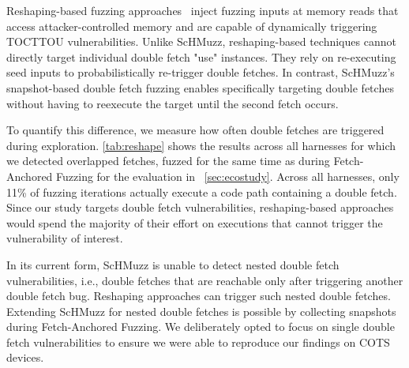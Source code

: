 \documentclass[conference]{IEEEtran}
\newcommand{\sysname}{ScHMuzz\xspace}
\newcommand{\stagetwo}{Fetch-Anchored Fuzzing\xspace}
\newcommand{\numexecsdfperc}{11\%\xspace}
\begin{document}
Reshaping-based fuzzing approaches~\cite{morphuzz, chen2024enclavefuzz} 
inject fuzzing inputs at memory reads that access 
attacker-controlled memory and are capable of dynamically triggering TOCTTOU vulnerabilities. 
Unlike \sysname, reshaping-based techniques cannot directly target individual double fetch "use" 
instances. They rely on re-executing seed inputs to probabilistically 
re-trigger double fetches. In contrast, \sysname's snapshot-based double fetch fuzzing 
enables specifically targeting double fetches without having to reexecute the target until 
the second fetch occurs. 

To quantify this difference, we measure 
how often double fetches are triggered during exploration. \autoref{tab:reshape} shows the results 
across all harnesses for which we detected overlapped fetches, fuzzed for the same time as during 
\stagetwo for the evaluation in ~\autoref{sec:ecostudy}. Across all harnesses, only 
\numexecsdfperc{} of fuzzing iterations actually execute a code path containing a double 
fetch. Since our study targets double fetch vulnerabilities, reshaping-based 
approaches would spend the majority of their effort on executions that cannot trigger the 
vulnerability of interest. 

In its current form, \sysname is unable to detect nested double fetch vulnerabilities, i.e., double fetches 
that are reachable only after triggering another double fetch bug. Reshaping approaches 
can trigger such nested double fetches. Extending \sysname for nested double fetches is possible 
by collecting snapshots during \stagetwo. We deliberately opted to focus on single double fetch 
vulnerabilities to ensure we were able to reproduce our findings on COTS devices. 
\end{document}

